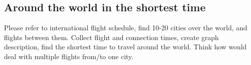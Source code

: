 \subsection{Around the world in the shortest time}

Please refer to international flight schedule, find 10-20 cities
over the world, and flights between them. Collect flight and connection
times, create graph description, find the shortest time to travel
around the world. Think how would deal with multiple flights from/to
one city.













